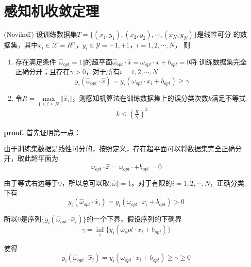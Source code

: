 \section{感知机收敛定理}

\begin{theorem}
    (Novikoff) 设训练数据集$T=\{(x_1,y_1),(x_2,y_2),\cdots,(x_N,y_N)\}$是线性可分
    的数据集，其中$x_i\in \mathcal{X}=R^n$，$y_i\in \mathcal{Y}={-1,+1}$，$i=1,2,\cdots,N$，
    则
    \begin{enumerate}[itemindent=2em]
        \item 存在满足条件$\Vert \hat{\omega}_{opt}=1\Vert$的超平面$\hat{\omega}_{opt}\cdot \hat{x}=\omega_{opt}\cdot x+b_{opt}=0$将
        训练数据集完全正确分开；且存在$\gamma>0$，对于所有$i=1,2,\cdots,N$
        \begin{equation}
            y_i(\hat{\omega}_{opt}\cdot\hat{x})=y_i(\omega_{opt}\cdot x_i+b_{opt})\geqslant \gamma
        \end{equation}

        \item 令$R=\max\limits_{1\leqslant i\leqslant N}\Vert \hat{x}_i \Vert$，则感知机算法在训练数据集上的误分类次数$k$满足不等式
        \begin{eqnarray}
            k\leqslant (\frac{R}{\gamma})^2
        \end{eqnarray}
    \end{enumerate}
\end{theorem}

\textbf{proof. } 首先证明第一点：

由于训练集数据是线性可分的，按照定义，存在超平面可以将数据集完全正确分开，取此超平面为
\begin{equation}
    \hat{\omega}_{opt}\cdot \hat{x}=\omega_{opt}\cdot+b_{opt}=0
\end{equation}

由于等式右边等于0，所以总可以取$\Vert \hat{\omega}\Vert=1$。对于有限的$i=1,2,\cdots,N$，正确分类下有
\begin{equation}
    y_i(\hat{\omega}_{opt}\cdot \hat{x}_i)=y_i(\omega_{opt}\cdot x_i+b_{opt})>0
\end{equation}

所以$0$是序列$\{ y_i(\hat{\omega}_{opt}\cdot \hat{x}_i)\}$的一个下界，假设序列的下确界
\begin{equation}
    \gamma=\inf\limits_{i}\{y_i(\omega_opt\cdot x_i+b_{opt})\}
\end{equation}

使得
\begin{equation}
    y_i(\hat{\omega}_{opt}\cdot \hat{x}_i)=y_i(\omega_{opt}\cdot x_i+b_{opt})\geqslant \gamma \geqslant 0
\end{equation}

